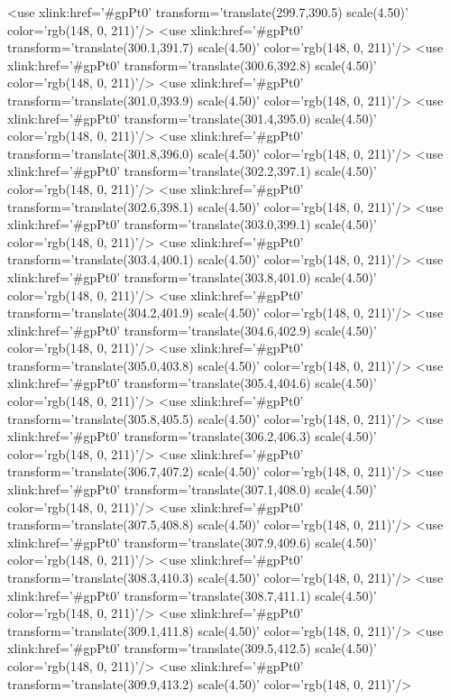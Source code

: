 	<use xlink:href='#gpPt0' transform='translate(299.7,390.5) scale(4.50)' color='rgb(148,   0, 211)'/>
	<use xlink:href='#gpPt0' transform='translate(300.1,391.7) scale(4.50)' color='rgb(148,   0, 211)'/>
	<use xlink:href='#gpPt0' transform='translate(300.6,392.8) scale(4.50)' color='rgb(148,   0, 211)'/>
	<use xlink:href='#gpPt0' transform='translate(301.0,393.9) scale(4.50)' color='rgb(148,   0, 211)'/>
	<use xlink:href='#gpPt0' transform='translate(301.4,395.0) scale(4.50)' color='rgb(148,   0, 211)'/>
	<use xlink:href='#gpPt0' transform='translate(301.8,396.0) scale(4.50)' color='rgb(148,   0, 211)'/>
	<use xlink:href='#gpPt0' transform='translate(302.2,397.1) scale(4.50)' color='rgb(148,   0, 211)'/>
	<use xlink:href='#gpPt0' transform='translate(302.6,398.1) scale(4.50)' color='rgb(148,   0, 211)'/>
	<use xlink:href='#gpPt0' transform='translate(303.0,399.1) scale(4.50)' color='rgb(148,   0, 211)'/>
	<use xlink:href='#gpPt0' transform='translate(303.4,400.1) scale(4.50)' color='rgb(148,   0, 211)'/>
	<use xlink:href='#gpPt0' transform='translate(303.8,401.0) scale(4.50)' color='rgb(148,   0, 211)'/>
	<use xlink:href='#gpPt0' transform='translate(304.2,401.9) scale(4.50)' color='rgb(148,   0, 211)'/>
	<use xlink:href='#gpPt0' transform='translate(304.6,402.9) scale(4.50)' color='rgb(148,   0, 211)'/>
	<use xlink:href='#gpPt0' transform='translate(305.0,403.8) scale(4.50)' color='rgb(148,   0, 211)'/>
	<use xlink:href='#gpPt0' transform='translate(305.4,404.6) scale(4.50)' color='rgb(148,   0, 211)'/>
	<use xlink:href='#gpPt0' transform='translate(305.8,405.5) scale(4.50)' color='rgb(148,   0, 211)'/>
	<use xlink:href='#gpPt0' transform='translate(306.2,406.3) scale(4.50)' color='rgb(148,   0, 211)'/>
	<use xlink:href='#gpPt0' transform='translate(306.7,407.2) scale(4.50)' color='rgb(148,   0, 211)'/>
	<use xlink:href='#gpPt0' transform='translate(307.1,408.0) scale(4.50)' color='rgb(148,   0, 211)'/>
	<use xlink:href='#gpPt0' transform='translate(307.5,408.8) scale(4.50)' color='rgb(148,   0, 211)'/>
	<use xlink:href='#gpPt0' transform='translate(307.9,409.6) scale(4.50)' color='rgb(148,   0, 211)'/>
	<use xlink:href='#gpPt0' transform='translate(308.3,410.3) scale(4.50)' color='rgb(148,   0, 211)'/>
	<use xlink:href='#gpPt0' transform='translate(308.7,411.1) scale(4.50)' color='rgb(148,   0, 211)'/>
	<use xlink:href='#gpPt0' transform='translate(309.1,411.8) scale(4.50)' color='rgb(148,   0, 211)'/>
	<use xlink:href='#gpPt0' transform='translate(309.5,412.5) scale(4.50)' color='rgb(148,   0, 211)'/>
	<use xlink:href='#gpPt0' transform='translate(309.9,413.2) scale(4.50)' color='rgb(148,   0, 211)'/>
